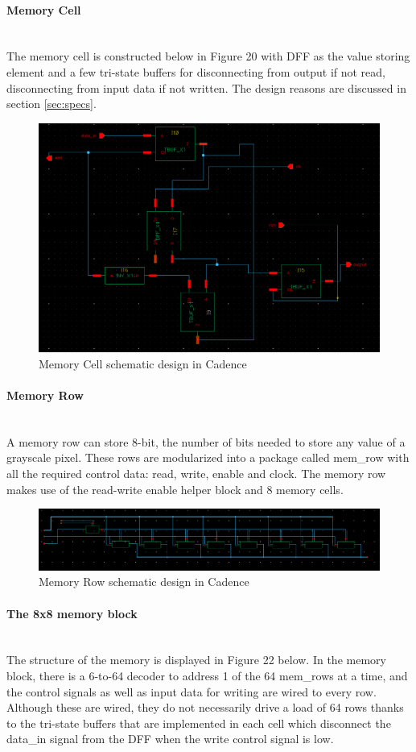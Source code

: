 \documentclass[letterpaper, 11pt]{article}
\newcommand{\subsubsubsection}[1]{\paragraph{#1}\mbox{}\\}
\begin{document}
	\subsubsubsection{Memory Cell}
	The memory cell is constructed below in Figure 20 with DFF as the value storing element and a few tri-state buffers for disconnecting from output if not read, disconnecting from input data if not written. The design reasons are discussed in section \ref{sec:specs}.
	
	\begin{figure}[htb!]
		\centering
		\includegraphics[width=0.85\linewidth]{report_pics/mem_cell_schem.png}
		\caption{Memory Cell schematic design in Cadence}
		\label{fig20}
	\end{figure}
	
	\subsubsubsection{Memory Row}
	A memory row can store 8-bit, the number of bits needed to store any value of a grayscale pixel. These rows are modularized into a package called mem\_row with all the required control data: read, write, enable and clock. The memory row makes use of the read-write enable helper block and 8 memory cells.
	
	\begin{figure}[htb!]
		\centering
		\includegraphics[width=0.85\linewidth]{report_pics/mem_row_schem.png}
		\caption{Memory Row schematic design in Cadence}
		\label{fig21}
	\end{figure}
	
	\subsubsubsection{The 8x8 memory block}
	The structure of the memory is displayed in Figure 22 below. In the memory block, there is a 6-to-64 decoder to address 1 of the 64 mem\_rows at a time, and the control signals as well as input data for writing are wired to every row. Although these are wired, they do not necessarily drive a load of 64 rows thanks to the tri-state buffers that are implemented in each cell which disconnect the data\_in signal from the DFF when the write control signal is low.
	
\end{document}

